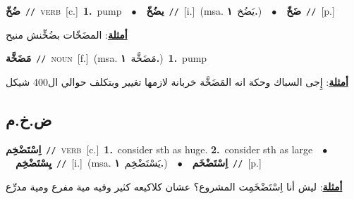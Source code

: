 \documentclass[10pt,a4paper,twoside]{article} %
\begin{document}
\begin{multicols}{2}
{{{{{{{{{{\setlength\topsep{0pt}\textbf{\foreignlanguage{arabic}{ضُخّ}}\ {\color{gray}\texttt{//}\color{black}}\ \textsc{verb}\ [c.]\ \textbf{1.}~pump\ \ $\bullet$\ \ \setlength\topsep{0pt}\textbf{\foreignlanguage{arabic}{يضُخّ}}\ {\color{gray}\texttt{//}\color{black}}\ [i.]\ \color{gray}(msa. \foreignlanguage{arabic}{يَضُخ}~\foreignlanguage{arabic}{\textbf{١.}})\color{black}\ \ $\bullet$\ \ \setlength\topsep{0pt}\textbf{\foreignlanguage{arabic}{ضَخّ}}\ {\color{gray}\texttt{//}\color{black}}\ [p.]\  \begin{flushright}\color{gray}\foreignlanguage{arabic}{\textbf{\underline{\foreignlanguage{arabic}{أمثلة}}}: المضَخّات بضُخِّنش منيح}\end{flushright}\color{black}} \vspace{2mm}

{\setlength\topsep{0pt}\textbf{\foreignlanguage{arabic}{مَضَخَّة}}\ {\color{gray}\texttt{//}\color{black}}\ \textsc{noun}\ [f.]\ \color{gray}(msa. \foreignlanguage{arabic}{مَضَخَّة}~\foreignlanguage{arabic}{\textbf{١.}})\color{black}\ \textbf{1.}~pump\  \begin{flushright}\color{gray}\foreignlanguage{arabic}{\textbf{\underline{\foreignlanguage{arabic}{أمثلة}}}: إِجى السباك وحكة انه المَضَخَّة خربانة لازمها تغيير وبتكلف حوالي ال400 شيكل}\end{flushright}\color{black}} \vspace{2mm}

\vspace{-3mm}
\subsection*{\color{blue}\foreignlanguage{arabic}{ض.خ.م}\color{blue}{}} 

{\setlength\topsep{0pt}\textbf{\foreignlanguage{arabic}{اِسْتَضْخِم}}\ {\color{gray}\texttt{//}\color{black}}\ \textsc{verb}\ [c.]\ \textbf{1.}~consider sth as huge.  \textbf{2.}~consider sth as large\ \ $\bullet$\ \ \setlength\topsep{0pt}\textbf{\foreignlanguage{arabic}{يِسْتَضْخِم}}\ {\color{gray}\texttt{//}\color{black}}\ [i.]\ \color{gray}(msa. \foreignlanguage{arabic}{يَسْتَضْخِم}~\foreignlanguage{arabic}{\textbf{١.}})\color{black}\ \ $\bullet$\ \ \setlength\topsep{0pt}\textbf{\foreignlanguage{arabic}{اِسْتَضْخَم}}\ {\color{gray}\texttt{//}\color{black}}\ [p.]\  \begin{flushright}\color{gray}\foreignlanguage{arabic}{\textbf{\underline{\foreignlanguage{arabic}{أمثلة}}}: ليش أنا اِسْتَضْخَمِت المشروع؟ عشان كلاكيعه كثير وفيه مية مفرع ومية مدرِّع}\end{flushright}\color{black}} \vspace{2mm}

}}}}}}}}}
\end{multicols}
\end{document}
